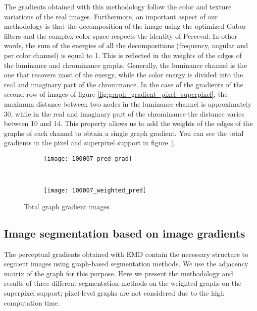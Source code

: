 The gradients obtained with this methodology follow the color and texture variations of the real images. Furthermore, an important aspect of our methodology is that the decomposition of the image using the optimized Gabor filters and the complex color space respects the identity of Perceval. In other words, the sum of the energies of all the decompositions (frequency, angular and per color channel) is equal to 1. This is reflected in the weights of the edges of the luminance and chrominance graphs. Generally, the luminance channel is the one that recovers most of the energy, while the color energy is divided into the real and imaginary part of the chrominance. In the case of the gradients of the second row of images of figure \ref{fig:graph_gradient_pixel_superpixel}, the maximum distance between two nodes in the luminance channel is approximately 30, while in the real and imaginary part of the chrominance the distance varies between 10 and 14. This property allows us to add the weights of the edges of the graphs of each channel to obtain a single graph gradient. You can see the total gradients in the pixel and superpixel support in figure \ref{fig:total_graph_gradient_pixel_superpixel}.

\begin{figure}[!ht]
    \centering
    \begin{subfigure}[b]{0.45\textwidth}
    	\texttt{[image: 100007\_pred\_grad]} 
    \end{subfigure}      
    ~ %
    \begin{subfigure}[b]{0.45\textwidth}
        \texttt{[image: 100007\_weighted\_pred]}
    \end{subfigure}    
	\caption{Total graph gradient images.}\label{fig:total_graph_gradient_pixel_superpixel}    
\end{figure}

\subsection{Image segmentation based on image gradients}
The perceptual gradients obtained with EMD contain the necessary structure to segment images using graph-based segmentation methods. We use the adjacency matrix of the graph for this purpose. Here we present the methodology and results of three different segmentation methods on the weighted graphs on the superpixel support; pixel-level graphs are not considered due to the high computation time. 

